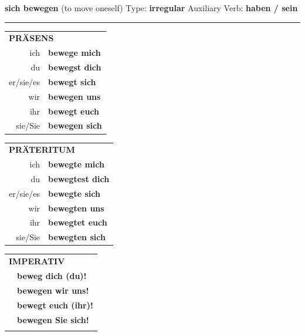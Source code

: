 \documentclass[10pt,a4paper]{revtex4-2}
\begin{document}
\begin{verbbox}
    {\Large \bf sich bewegen} (to move oneself) \hfill Type: \textbf{irregular} \hfill Auxiliary Verb: \textbf{haben / sein} 
    
     \vspace{5pt}
    \hrule
    \vspace{5pt}

  \begin{tabular}{rl}
     \multicolumn{2}{l}{\textbf{PRÄSENS} }\\
    ich & \textbf{bewege mich}\\
    du & \textbf{bewegst dich}\\
    er/sie/es & \textbf{bewegt sich}\\
    wir & \textbf{bewegen uns}\\
    ihr & \textbf{bewegt euch}\\
    sie/Sie & \textbf{bewegen sich}\\
  \end{tabular}
  \hfill
     \begin{tabular}{rl}
    \multicolumn{2}{l}{\textbf{PRÄTERITUM} }\\
    ich & \textbf{bewegte mich}\\
    du & \textbf{bewegtest dich}\\
    er/sie/es & \textbf{bewegte sich}\\
    wir & \textbf{bewegten uns}\\
    ihr & \textbf{bewegtet euch}\\
    sie/Sie & \textbf{bewegten sich}\\
  \end{tabular}
  \hfill
  \begin{tabular}{rl}
     \multicolumn{2}{l}{\textbf{IMPERATIV} }\\
   & \textbf{beweg dich (du)!}\\
   & \textbf{bewegen wir uns!}\\
   & \textbf{bewegt euch (ihr)!}\\
   & \textbf{bewegen Sie sich!}\\
   & \vspace{10pt}
  \end{tabular}

 \vspace{10pt}


\end{verbbox}
\end{document}
